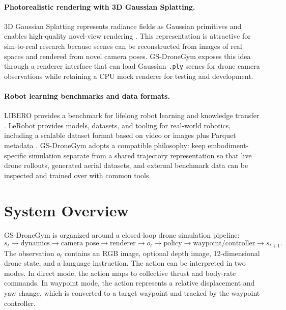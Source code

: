 \documentclass[11pt]{article}
\begin{document}
\paragraph{Photorealistic rendering with 3D Gaussian Splatting.}
3D Gaussian Splatting represents radiance fields as Gaussian primitives and enables high-quality novel-view rendering \cite{kerbl20233dgs}. This representation is attractive for sim-to-real research because scenes can be reconstructed from images of real spaces and rendered from novel camera poses. GS-DroneGym exposes this idea through a renderer interface that can load Gaussian \texttt{.ply} scenes for drone camera observations while retaining a CPU mock renderer for testing and development.

\paragraph{Robot learning benchmarks and data formats.}
LIBERO provides a benchmark for lifelong robot learning and knowledge transfer \cite{liu2023libero}. LeRobot provides models, datasets, and tooling for real-world robotics, including a scalable dataset format based on video or images plus Parquet metadata \cite{cadene2024lerobot}. GS-DroneGym adopts a compatible philosophy: keep embodiment-specific simulation separate from a shared trajectory representation so that live drone rollouts, generated aerial datasets, and external benchmark data can be inspected and trained over with common tools.

\section{System Overview}

GS-DroneGym is organized around a closed-loop drone simulation pipeline:
\[
s_t \rightarrow \text{dynamics} \rightarrow \text{camera pose} \rightarrow \text{renderer}
\rightarrow o_t \rightarrow \text{policy} \rightarrow \text{waypoint/controller} \rightarrow s_{t+1}.
\]
The observation $o_t$ contains an RGB image, optional depth image, 12-dimensional drone state, and a language instruction. The action can be interpreted in two modes. In direct mode, the action maps to collective thrust and body-rate commands. In waypoint mode, the action represents a relative displacement and yaw change, which is converted to a target waypoint and tracked by the waypoint controller.
\end{document}
